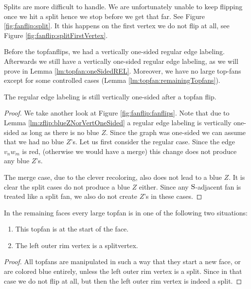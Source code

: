   Splits are more difficult to handle. We are unfortunately unable to keep flipping once we hit a split hence we stop before we get that far. See Figure \ref{fig:fanflip:split}. It this happens on the first vertex we do not flip at all, see Figure \ref{fig:fanflip:splitFirstVertex}.

Before the topfanflips, we had a vertically one-sided regular edge labeling. Afterwards we still have a vertically one-sided regular edge labeling, as we will prove in Lemma \ref{lm:topfan:oneSidedREL}. Moreover, we have no large top-fans except for some controlled cases (Lemma \ref{lm:topfan:remainingTopfans}).

\begin{lemma}
  \label{lm:topfan:oneSidedREL}
  The regular edge labeling is still vertically one-sided after a topfan flip.
\end{lemma}
\begin{proof}
  We take another look at Figure \ref{fig:fanflip:fanflips}. Note that due to Lemma \ref{lm:zflip:blueZNorVertOneSided} a regular edge labeling is vertically one-sided as long as there is no blue $Z$.  Since the graph was one-sided we can assume that we had no blue $Z$'s.
  Let us first consider the regular case. Since the edge  $v_n w_m$ is red, (otherwise we would have a merge) this change does not produce any blue $Z$'s.

  The merge case, due to the clever recoloring, also does not lead to a blue $Z$.
  It is clear the split cases do not produce a blue $Z$ either.
  Since any $\mathrm{S}$-adjacent fan is treated like a split fan, we also do not create $Z$'s in these cases.
\end{proof}


\begin{lemma}
  \label{lm:topfan:remainingTopfans}
  In the remaining faces every large topfan is in one of the following two situations:
  \begin{enumerate}
    \item  This topfan is at the start of the face.
    \item  The left outer rim vertex is a splitvertex.
  \end{enumerate}
\end{lemma}
\begin{proof}
  All topfans are manipulated in such a way that they start a new face, or are colored blue entirely, unless the left outer rim vertex is a split. Since in that case we do not flip at all, but then the left outer rim vertex is indeed a split.
\end{proof}
